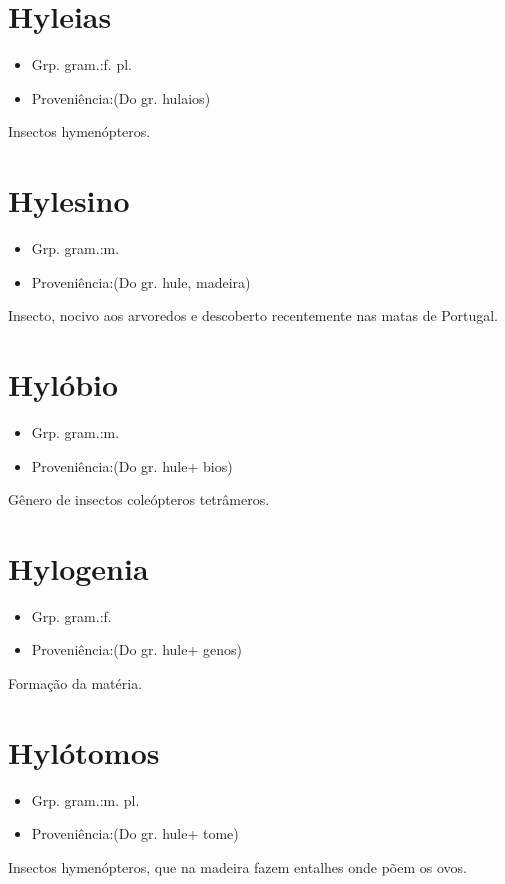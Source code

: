 \documentclass{article}
\begin{document}
\section{Hyleias}
\begin{itemize}
\item {Grp. gram.:f. pl.}
\end{itemize}
\begin{itemize}
\item {Proveniência:(Do gr. \textunderscore hulaios\textunderscore )}
\end{itemize}
Insectos hymenópteros.
\section{Hylesino}
\begin{itemize}
\item {Grp. gram.:m.}
\end{itemize}
\begin{itemize}
\item {Proveniência:(Do gr. \textunderscore hule\textunderscore , madeira)}
\end{itemize}
Insecto, nocivo aos arvoredos e descoberto recentemente nas matas de Portugal.
\section{Hylóbio}
\begin{itemize}
\item {Grp. gram.:m.}
\end{itemize}
\begin{itemize}
\item {Proveniência:(Do gr. \textunderscore hule\textunderscore  + \textunderscore bios\textunderscore )}
\end{itemize}
Gênero de insectos coleópteros tetrâmeros.
\section{Hylogenia}
\begin{itemize}
\item {Grp. gram.:f.}
\end{itemize}
\begin{itemize}
\item {Proveniência:(Do gr. \textunderscore hule\textunderscore  + \textunderscore genos\textunderscore )}
\end{itemize}
Formação da matéria.
\section{Hylótomos}
\begin{itemize}
\item {Grp. gram.:m. pl.}
\end{itemize}
\begin{itemize}
\item {Proveniência:(Do gr. \textunderscore hule\textunderscore  + \textunderscore tome\textunderscore )}
\end{itemize}
Insectos hymenópteros, que na madeira fazem entalhes onde põem os ovos.
\end{document}
